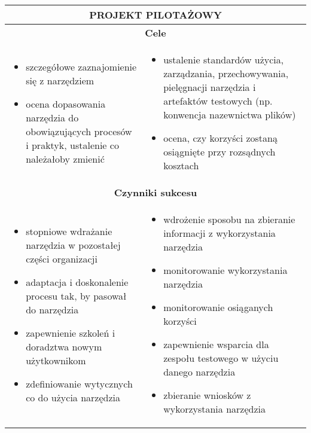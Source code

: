 \documentclass[../main.tex]{subfiles}
\begin{document}
    \begin{table}[H]
        \begin{center}
            \begin{tabular}{| p{8cm} | p{8cm} |}
                \hline
                \multicolumn{2}{|c|}{\textbf{PROJEKT PILOTAŻOWY}}\\
                \hline
                \hline
                \multicolumn{2}{|c|}{\textbf{Cele}}\\
                \hline
                \begin{itemize}
                    \item szczegółowe zaznajomienie się z narzędziem
                    \item ocena dopasowania narzędzia do obowiązujących procesów i praktyk, ustalenie co należałoby zmienić
                \end{itemize}
                &
                \begin{itemize}
                    \item ustalenie standardów użycia, zarządzania, przechowywania, pielęgnacji narzędzia i artefaktów testowych (np. konwencja nazewnictwa plików)
                    \item ocena, czy korzyści zostaną osiągnięte przy rozsądnych kosztach
                \end{itemize}\\
                \hline
                \hline
                \multicolumn{2}{|c|}{\textbf{Czynniki sukcesu}}\\
                \hline
                \begin{itemize}
                    \item stopniowe wdrażanie narzędzia w pozostałej części organizacji
                    \item adaptacja i doskonalenie procesu tak, by pasował do narzędzia
                    \item zapewnienie szkoleń i doradztwa nowym użytkownikom
                    \item zdefiniowanie wytycznych co do użycia narzędzia
                    \end{itemize}
                &
                \begin{itemize}
                    \item wdrożenie sposobu na zbieranie informacji z wykorzystania narzędzia
                    \item monitorowanie wykorzystania narzędzia
                    \item monitorowanie osiąganych korzyści
                    \item zapewnienie wsparcia dla zespołu testowego w użyciu danego narzędzia
                    \item zbieranie wniosków z wykorzystania narzędzia
                \end{itemize}\\
                \hline
            \end{tabular}
        \end{center}
    \end{table}
\end{document}
